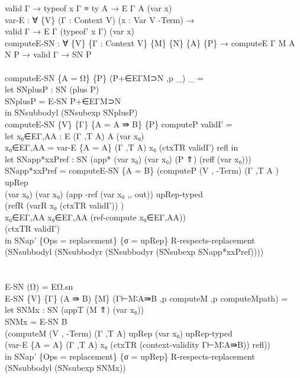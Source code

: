 {\begin{code}
{\>  valid Γ → typeof x Γ ≡ ty A → E Γ A (var x)\<\\
\>var-E : ∀ \{V\} (Γ : Context V) (x : Var V -Term) → \<\\
\>        valid Γ → E Γ (typeof' x Γ) (var x)\<\\
\>computeE-SN : ∀ \{V\} \{Γ : Context V\} \{M\} \{N\} \{A\} \{P\} → computeE Γ M A N P → valid Γ → SN P\<\\
\>\<\\
\>computeE-SN \{A = Ω\} \{P\} (P+∈EΓM⊃N ,p \_) \_ = \<\\
\>  let SNplusP : SN (plus P)\<\\
\>      SNplusP = E-SN P+∈EΓM⊃N \<\\
\>  in SNsubbodyl (SNsubexp SNplusP)\<\\
\>computeE-SN \{V\} \{Γ\} \{A = A ⇛ B\} \{P\} computeP validΓ =\<\\
\>  let x₀∈EΓ,AA : E (Γ ,T A) A (var x₀)\<\\
\>      x₀∈EΓ,AA = var-E \{A = A\} (Γ ,T A) x₀ (ctxTR validΓ) refl in\<\\
\>  let SNapp*xxPref : SN (app* (var x₀) (var x₀) (P ⇑) (reff (var x₀)))\<\\
\>      SNapp*xxPref = computeE-SN \{A = B\} (computeP (V , -Term) (Γ ,T A ) upRep \<\\
\>          (var x₀) (var x₀) (app -ref (var x₀ ,, out)) upRep-typed \<\\
\>          (refR (varR x₀ (ctxTR validΓ)) )\<\\
\>          x₀∈EΓ,AA x₀∈EΓ,AA (ref-compute x₀∈EΓ,AA)) \<\\
\>          (ctxTR validΓ)\<\\
\>  in SNap' \{Ops = replacement\} \{σ = upRep\} R-respects-replacement (SNsubbodyl (SNsubbodyr (SNsubbodyr (SNsubexp SNapp*xxPref))))\<\\
\>\<\\
\>\<\\
\>E-SN (Ω) = EΩ.sn\<\\
\>E-SN \{V\} \{Γ\} (A ⇛ B) \{M\} (Γ⊢M∶A⇛B ,p computeM ,p computeMpath) =\<\\
\>  let SNMx : SN (appT (M ⇑) (var x₀))\<\\
\>      SNMx = E-SN B \<\\
\>             (computeM (V , -Term) (Γ ,T A) upRep (var x₀) upRep-typed \<\\
\>             (var-E \{A = A\} (Γ ,T A) x₀ (ctxTR (context-validity Γ⊢M∶A⇛B)) refl)) \<\\
\>  in SNap' \{Ops = replacement\} \{σ = upRep\} R-respects-replacement (SNsubbodyl (SNsubexp SNMx)) \<\\
}
\end{code}}

